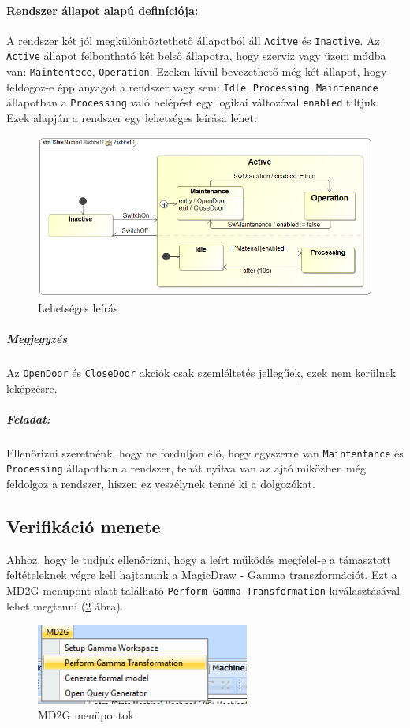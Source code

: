 \paragraph{Rendszer állapot alapú definíciója:} A rendszer két jól megkülönböztethető állapotból áll \verb+Acitve+ és \verb+Inactive+. Az \verb+Active+ állapot felbontható két belső állapotra, hogy szerviz vagy üzem módba van: \verb+Maintentece+, \verb+Operation+. Ezeken kívül bevezethető még két állapot, hogy feldogoz-e épp anyagot a rendszer vagy sem: \verb+Idle+, \verb+Processing+. \verb+Maintenance+ állapotban a \verb+Processing+ való belépést egy logikai változóval \verb+enabled+ tiltjuk. Ezek alapján a rendszer egy lehetséges leírása lehet:
\begin{figure}[H]
	\centering
	\includegraphics[keepaspectratio, width=150mm]{figures/machine1.png}
	\caption{Lehetséges leírás}
	\label{fig:leiras}
\end{figure}
\subparagraph{Megjegyzés} Az \verb+OpenDoor+ és \verb+CloseDoor+ akciók csak szemléltetés jellegűek, ezek nem kerülnek leképzésre.
\subparagraph{Feladat:} Ellenőrizni szeretnénk, hogy ne forduljon elő, hogy egyszerre van \verb+Maintentance+ és \verb+Processing+ állapotban a rendszer, tehát nyitva van az ajtó miközben még feldolgoz a rendszer, hiszen ez
veszélynek tenné ki a dolgozókat.
\subsection{Verifikáció menete}
Ahhoz, hogy le tudjuk ellenőrizni, hogy a leírt működés megfelel-e a támasztott feltételeknek végre kell hajtanunk a MagicDraw - Gamma transzformációt. Ezt a MD2G menüpont alatt található \verb+Perform Gamma Transformation+ kiválasztásával lehet megtenni (\ref{fig:md2g} ábra).
\begin{figure}[H]
	\centering
	\includegraphics[keepaspectratio, width=70mm]{figures/GammaTrafo.png}
	\caption{MD2G menüpontok}
	\label{fig:md2g}
\end{figure}

